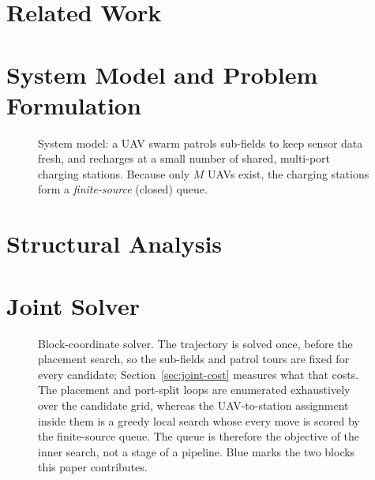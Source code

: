 \documentclass[journal]{IEEEtran}
\begin{document}
\section{Related Work}
\label{sec:related}

\section{System Model and Problem Formulation}
\label{sec:model}

\begin{figure}[t]
  \centering
  \resizebox{\columnwidth}{!}{}
  \caption{System model: a UAV swarm patrols sub-fields to keep sensor data
  fresh, and recharges at a small number of shared, multi-port charging
  stations. Because only $M$ UAVs exist, the charging stations form a
  \emph{finite-source} (closed) queue.}
  \label{fig:system}
\end{figure}

\section{Structural Analysis}
\label{sec:analysis}


\section{Joint Solver}
\label{sec:solver}


\begin{figure}[t]
  \centering
  \resizebox{\textwidth}{!}{}
  \caption{Block-coordinate solver. The trajectory is solved once, before the
  placement search, so the sub-fields and patrol tours are fixed for every candidate;
  Section~\ref{sec:joint-cost} measures what that costs. The placement and port-split
  loops are enumerated exhaustively over the candidate grid, whereas the UAV-to-station
  assignment inside them is a greedy local search whose every move is scored by the
  finite-source queue. The queue is therefore the objective of the inner search, not a
  stage of a pipeline. Blue marks the two blocks this paper contributes.}
  \label{fig:solver}
\end{figure}
\end{document}

